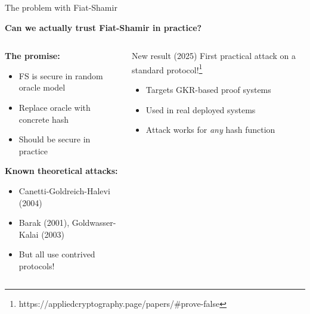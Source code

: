 \documentclass[aspectratio=169, lualatex, handout]{beamer}
\begin{document}
\begin{frame}{The problem with Fiat-Shamir}
	\begin{center}
		\textbf{Can we actually trust Fiat-Shamir in practice?}
	\end{center}
	\vspace{0.5em}
	\begin{columns}[c]
		\begin{column}{0.5\textwidth}
			\textbf{The promise:}
			\begin{itemize}
				\item FS is secure in random oracle model
				\item Replace oracle with concrete hash
				\item Should be secure in practice
			\end{itemize}
			\vspace{0.5em}
			\textbf{Known theoretical attacks:}
			\begin{itemize}
				\item Canetti-Goldreich-Halevi (2004)
				\item Barak (2001), Goldwasser-Kalai (2003)
				\item But all use contrived protocols!
			\end{itemize}
		\end{column}
		\begin{column}{0.5\textwidth}
			\begin{alertblock}{New result (2025)}
				First practical attack on a standard protocol!\footnote{https://appliedcryptography.page/papers/\#prove-false}
				\begin{itemize}
					\item Targets GKR-based proof systems
					\item Used in real deployed systems
					\item Attack works for \textit{any} hash function
				\end{itemize}
			\end{alertblock}
		\end{column}
	\end{columns}
\end{frame}
\end{document}
